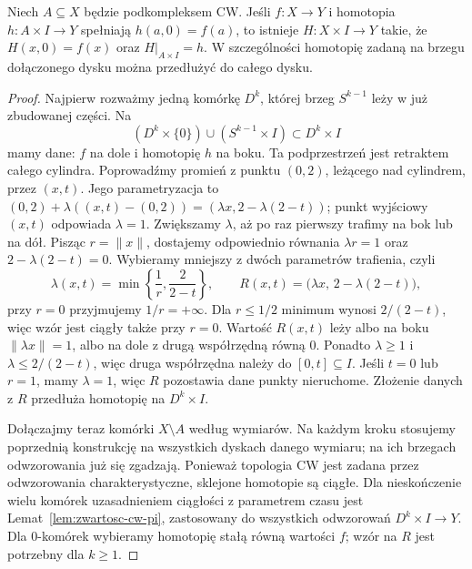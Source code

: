 \begin{lemat}
\label{lem:hep-cw}
Niech $A\subseteq X$ będzie podkompleksem
CW. Jeśli $f:X\to Y$ i homotopia
$h:A\times I\to Y$ spełniają
$h(a,0)=f(a)$, to istnieje
$H:X\times I\to Y$ takie, że
$H(x,0)=f(x)$ oraz $H|_{A\times I}=h$.
W szczególności homotopię
zadaną na brzegu dołączonego
dysku można przedłużyć do
całego dysku.
\end{lemat}
\begin{proof}
Najpierw rozważmy jedną komórkę
$D^k$, której brzeg $S^{k-1}$
leży w już zbudowanej części.
Na
\[
 (D^k\times\{0\})\cup
 (S^{k-1}\times I)
\subset D^k\times I
\]
mamy dane: $f$ na dole
i homotopię $h$ na boku.
Ta podprzestrzeń jest
retraktem całego cylindra. Poprowadźmy promień z punktu
$(0,2)$, leżącego nad cylindrem, przez $(x,t)$.
Jego parametryzacja to
$(0,2)+\lambda((x,t)-(0,2))=(\lambda x,2-\lambda(2-t))$;
punkt wyjściowy $(x,t)$ odpowiada $\lambda=1$.
Zwiększamy $\lambda$, aż po raz pierwszy trafimy na bok
lub na dół. Pisząc $r=\|x\|$, dostajemy odpowiednio równania
$\lambda r=1$ oraz $2-\lambda(2-t)=0$.
Wybieramy mniejszy z dwóch parametrów trafienia, czyli
\[
 \lambda(x,t)=
 \min\left\{\frac1r,\frac2{2-t}\right\},
 \qquad
 R(x,t)=\bigl(\lambda x,\,
                  2-\lambda(2-t)\bigr),
\]
przy $r=0$ przyjmujemy
$1/r=+\infty$. Dla $r\leq1/2$ minimum wynosi $2/(2-t)$,
więc wzór jest ciągły także przy $r=0$. Wartość
$R(x,t)$ leży albo na boku
$\|\lambda x\|=1$, albo
na dole z drugą współrzędną
równą $0$. Ponadto $\lambda\geq1$ i
$\lambda\leq2/(2-t)$, więc druga współrzędna należy do $[0,t]\subseteq I$.
Jeśli $t=0$
lub $r=1$, mamy $\lambda=1$,
więc $R$ pozostawia dane
punkty nieruchome.
Złożenie danych z $R$
przedłuża homotopię
na $D^k\times I$.

Dołączajmy teraz komórki
$X\setminus A$ według
wymiarów. Na każdym kroku
stosujemy poprzednią
konstrukcję na wszystkich
dyskach danego wymiaru;
na ich brzegach odwzorowania
już się zgadzają. Ponieważ
topologia CW jest zadana
przez odwzorowania charakterystyczne,
sklejone homotopie są
ciągłe. Dla nieskończenie wielu komórek uzasadnieniem ciągłości
z parametrem czasu jest Lemat~\ref{lem:zwartosc-cw-pi},
zastosowany do wszystkich odwzorowań $D^k\times I\to Y$.
Dla $0$-komórek wybieramy homotopię stałą równą wartości $f$;
wzór na $R$ jest potrzebny dla $k\geq1$.
\end{proof}

